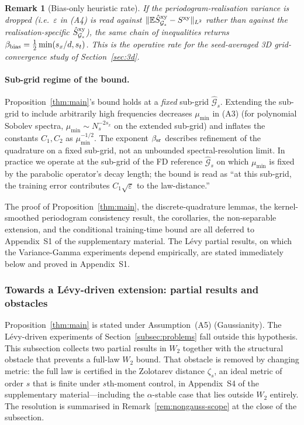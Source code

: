 \documentclass[review,12pt]{elsarticle}
\newtheorem{remark}{Remark}
\begin{document}
\begin{remark}[Bias-only heuristic rate]\label{rem:raw-rate}
If the periodogram-realisation variance is dropped (i.e.\
\(\varepsilon\) in (A4) is read against
\(\|\mathbb E\hat S^{\rm xy}_{\mathcal G_s} - S^{\rm xy}\|_{L^2}\)
rather than against the realisation-specific
\(\hat S^{\rm xy}_{\mathcal G_s}\)), the same chain of inequalities
returns \(\beta_{\rm bias} = \tfrac12\min(s_x/d, s_t)\). This is the
operative rate for the seed-averaged 3D grid-convergence study of
Section~\ref{sec:3d}.
\end{remark}

\paragraph{Sub-grid regime of the bound.}\label{para:subgrid-regime}
Proposition~\ref{thm:main}'s bound holds at a \emph{fixed} sub-grid
$\widehat{\mathcal G}_s$. Extending the sub-grid to include
arbitrarily high frequencies decreases $\mu_{\min}$ in (A3) (for
polynomial Sobolev spectra, $\mu_{\min}\sim N_s^{-2s_x}$ on the
extended sub-grid) and inflates the constants $C_1, C_2$ as
$\mu_{\min}^{-1/2}$. The exponent $\beta_{\rm sr}$ describes
refinement of the quadrature on a fixed sub-grid, not an unbounded
spectral-resolution limit. In practice we operate at the sub-grid
of the FD reference $\widehat{\mathcal G}_s$ on which $\mu_{\min}$
is fixed by the parabolic operator's decay length; the bound is
read as ``at this sub-grid, the training error contributes
$C_1\sqrt\varepsilon$ to the law-distance.''

The proof of Proposition~\ref{thm:main}, the discrete-quadrature lemmas,
the kernel-smoothed periodogram consistency result, the corollaries,
the non-separable extension, and the conditional training-time bound
are all deferred to Appendix~S1 of the supplementary material. The
L\'evy partial results, on which the Variance-Gamma experiments
depend empirically, are stated immediately below and proved in
Appendix~S1.

\subsubsection{Towards a L\'evy-driven extension: partial results and
obstacles}
\label{subsec:levy-ext}

Proposition~\ref{thm:main} is stated under Assumption~(A5) (Gaussianity).
The L\'evy-driven experiments of Section~\ref{subsec:problems} fall
outside this hypothesis. This subsection collects two partial results
in $W_2$ together with the structural obstacle that prevents a full-law
$W_2$ bound. That obstacle is removed by changing metric: the full law
is certified in the Zolotarev distance $\zeta_s$, an ideal metric of
order $s$ that is finite under $s$th-moment control, in
Appendix~S4 of the supplementary material---including the
$\alpha$-stable case that lies outside $W_2$ entirely. The resolution
is summarised in Remark~\ref{rem:nongauss-scope} at the close of the
subsection.
\end{document}

